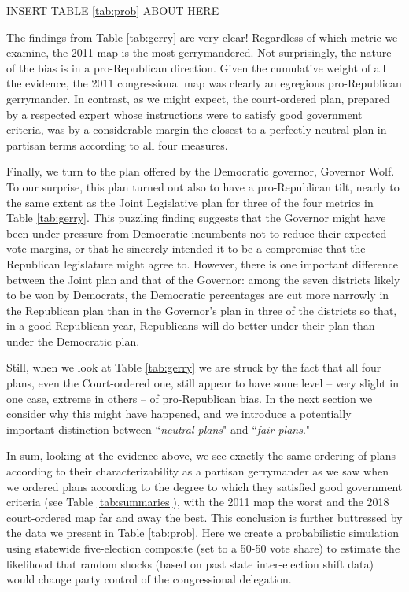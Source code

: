%
\begin{center} INSERT TABLE \ref{tab:prob} ABOUT HERE \end{center}
\par
    The findings from Table \ref{tab:gerry} are very clear! Regardless of which metric we examine, the 2011 map is the most gerrymandered. Not surprisingly, the nature of the bias is in a pro-Republican direction. Given the cumulative weight of all the evidence, the 2011 congressional map was clearly an egregious pro-Republican gerrymander. In contrast, as we might expect, the court-ordered plan, prepared by a respected expert whose instructions were to satisfy good government criteria, was by a considerable margin the closest to a perfectly neutral plan in partisan terms according to all four measures. 
\par
    Finally, we turn to the plan offered by the Democratic governor, Governor Wolf. To our surprise, this plan turned out also to have a pro-Republican tilt, nearly to the same extent as the Joint Legislative plan for three of the four metrics in Table \ref{tab:gerry}. This puzzling finding suggests that the Governor might have been under pressure from Democratic incumbents not to reduce their expected vote margins, or that he sincerely intended it to be a compromise that the Republican legislature might agree to. However, there is one important difference between the Joint plan and that of the Governor: among the seven districts likely to be won by Democrats, the Democratic percentages are cut more narrowly in the Republican plan than in the Governor’s plan in three of the districts so that, in a good Republican year, Republicans will do better under their plan than under the Democratic plan.
\par
    Still, when we look at Table \ref{tab:gerry} we are struck by the fact that all four plans, even the Court-ordered one, still appear to have some level -- very slight in one case, extreme in others -- of pro-Republican bias. In the next section we consider why this might have happened, and we introduce a potentially important distinction between ``\textit{neutral plans}" and ``\textit{fair plans}."
\par
    In sum, looking at the evidence above, we see exactly the same ordering of plans according to their characterizability as a partisan gerrymander as we saw when we ordered plans according to the degree to which they satisfied good government criteria (see Table \ref{tab:summaries}), with the 2011 map the worst and the 2018 court-ordered map far and away the best. This conclusion is further buttressed by the data we present in Table \ref{tab:prob}. Here we create a probabilistic simulation using statewide five-election composite (set to a 50-50 vote share) to estimate the likelihood that random shocks (based on past state inter-election shift data) would change party control of the congressional delegation. 
